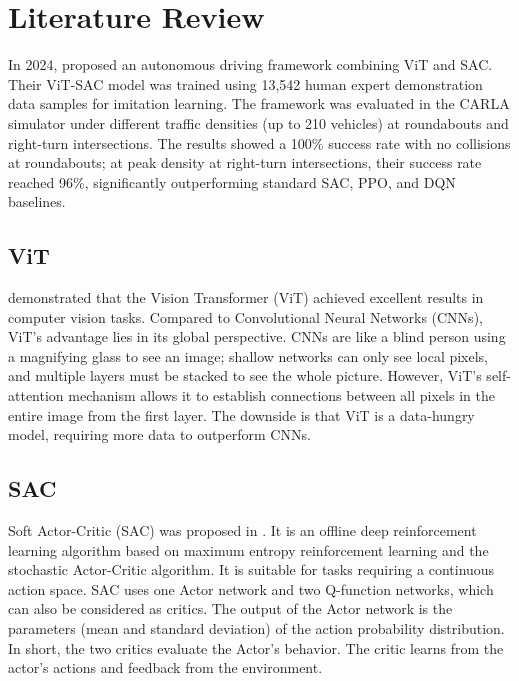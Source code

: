
\section{Literature Review}
    In 2024, \cite{elallid_improving_2024} proposed an autonomous driving framework combining ViT and SAC. Their ViT-SAC model was trained using 13,542 human expert demonstration data samples for imitation learning. The framework was evaluated in the CARLA simulator under different traffic densities (up to 210 vehicles) at roundabouts and right-turn intersections. The results showed a 100\% success rate with no collisions at roundabouts; at peak density at right-turn intersections, their success rate reached 96\%, significantly outperforming standard SAC, PPO, and DQN baselines.

    \subsection{ViT}
    \cite{dosovitskiy_image_2021} demonstrated that the Vision Transformer (ViT) achieved excellent results in computer vision tasks. Compared to Convolutional Neural Networks (CNNs), ViT's advantage lies in its global perspective. CNNs are like a blind person using a magnifying glass to see an image; shallow networks can only see local pixels, and multiple layers must be stacked to see the whole picture. However, ViT's self-attention mechanism allows it to establish connections between all pixels in the entire image from the first layer. The downside is that ViT is a data-hungry model, requiring more data to outperform CNNs.

    \subsection{SAC}
    Soft Actor-Critic (SAC) was proposed in \cite{haarnoja_soft_2018}. It is an offline deep reinforcement learning algorithm based on maximum entropy reinforcement learning and the stochastic Actor-Critic algorithm. It is suitable for tasks requiring a continuous action space. SAC uses one Actor network and two Q-function networks, which can also be considered as critics. The output of the Actor network is the parameters (mean and standard deviation) of the action probability distribution. In short, the two critics evaluate the Actor's behavior. The critic learns from the actor's actions and feedback from the environment.

